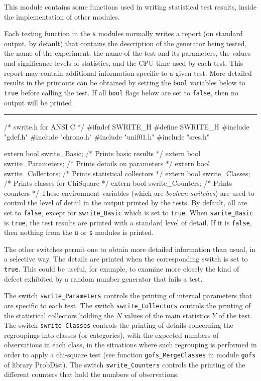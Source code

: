 
This module contains some functions used in writing statistical
test results, inside the implementation of other modules.

Each testing function in the {\tt s} modules normally
writes a report (on standard output, by default)
that contains the description of the generator being tested,
the name of the experiment, the name of the test and its parameters,
the values and significance levels of statistics,
and the CPU time used by each test.
This report may contain additional information specific to a given test.
More detailed results in the printouts can be obtained by setting
the {\tt bool} variables below to {\tt true} before
calling the test. If all {\tt bool} flags below are set to {\tt false}, then
no output will be printed.


\bigskip\hrule
\code\hide
/* swrite.h for ANSI C */
#ifndef SWRITE_H
#define SWRITE_H
\endhide
#include "gdef.h"
#include "chrono.h"
#include "unif01.h"
#include "sres.h"
\endcode



\code

extern bool swrite_Basic;           /* Prints basic results           */
extern bool swrite_Parameters;      /* Prints details on parameters   */
extern bool swrite_Collectors;      /* Prints statistical collectors  */
extern bool swrite_Classes;         /* Prints classes for ChiSquare   */
extern bool swrite_Counters;        /* Prints counters                */
\endcode
 \tab These environment variables (which are {\em boolean switches\/}) are used to
  control the level of detail in the output printed by the tests.
  By default, all are set to {\tt false}, except for
  {\tt swrite\_Basic} which is set to {\tt true}.
  When {\tt swrite\_Basic} is {\tt true}, the test results are printed
  with a standard level of detail.
  If it is {\tt false}, then nothing from the  {\tt u} or  {\tt s}
  modules is printed.

  The other switches permit one to obtain more detailed information than
  usual, in a selective way.  The details are printed when the
  corresponding switch is set to {\tt true}.
  This could be useful, for example, to examine more closely the kind of
  defect exhibited by a random number generator that fails a test.

  The switch {\tt swrite\_Parameters}  controls the printing of
  internal parameters that are specific to each test.
  The switch {\tt swrite\_Collectors} controls the printing of the
  statistical collectors holding the $N$ values of the main statistics
  $Y$ of the test.
  The switch {\tt swrite\_Classes} controls the printing of details
  concerning the regroupings into classes (or categories),
  with the expected numbers of observations in each class,
  in the situations where such regrouping is performed in order
  to apply a  chi-square test (see function  {\tt gofs\_MergeClasses}
  in module {\tt gofs} of library ProbDist).
  The switch {\tt swrite\_Counters} controls the printing of the different
  counters that hold the numbers of observations.
 \endtab
\code


